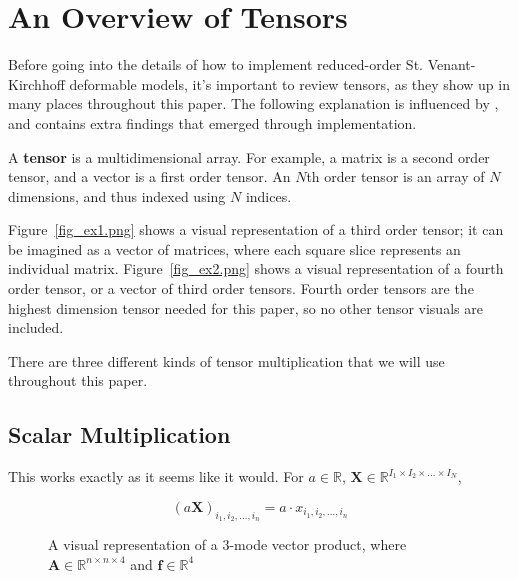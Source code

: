 \documentclass[twocolumn,10pt]{asme2ej}
\begin{document}
\section{An Overview of Tensors}

Before going into the details of how to implement reduced-order St. Venant-Kirchhoff deformable models, it's important to review tensors, as they show up in many places throughout this paper. The following explanation is influenced by \cite{tensors}, and contains extra findings that emerged through implementation.

A \textbf{tensor} is a multidimensional array. For example, a matrix is a second order tensor, and a vector is a first order tensor. An $N$th order tensor is an array of $N$ dimensions, and thus indexed using $N$ indices.

Figure~\ref{fig_ex1.png} shows a visual representation of a third order tensor; it can be imagined as a vector of matrices, where each square slice represents an individual matrix. Figure~\ref{fig_ex2.png} shows a visual representation of a fourth
order tensor, or a vector of third order tensors. Fourth order tensors are the highest dimension tensor needed for this paper, so no other tensor visuals are included.

There are three different kinds of tensor multiplication that we will use throughout this paper.

\subsection{Scalar Multiplication}

This works exactly as it seems like it would. For $a \in \mathbb{R}$, $\bm{X} \in \mathbb{R}^{I_1 \times I_2 \times ... \times I_N}$,

\begin{equation}
(a\bm{X})_{i_1, i_2, ..., i_n} = a\cdot x_{i_1, i_2, ..., i_n}
\end{equation}

\begin{figure}
\caption{A visual representation of a 3-mode vector product, where $\bm{A} \in \mathbb{R}^{n \times n \times 4}$ and $\bm{f} \in \mathbb{R}^{4}$}
\label{fig_ex3.png}
\end{figure}
\end{document}
